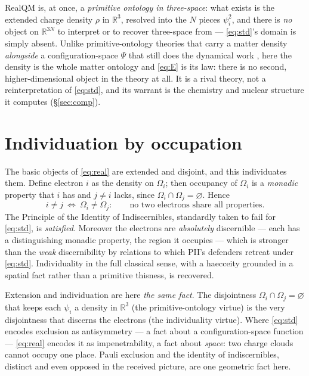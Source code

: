 \documentclass[11pt]{article}
\begin{document}
RealQM is, at once, a \emph{primitive ontology in three-space}: what exists is the extended charge density
$\rho$ in $\mathbb R^3$, resolved into the $N$ pieces $\psi_i^2$, and there is \emph{no} object on
$\mathbb R^{3N}$ to interpret or to recover three-space from --- \eqref{eq:std}'s domain is simply absent.
Unlike primitive-ontology theories that carry a matter density \emph{alongside} a configuration-space
$\Psi$ that still does the dynamical work \cite{Allori2013}, here the density is the whole matter ontology
and \eqref{eq:E} is its law: there is no second, higher-dimensional object in the theory at all. It is a
rival theory, not a reinterpretation of \eqref{eq:std}, and its warrant is the chemistry and nuclear
structure it computes (\S\ref{sec:comp}).

\section{Individuation by occupation}
\label{sec:ind}

The basic objects of \eqref{eq:real} are extended and disjoint, and this individuates them. Define electron
$i$ as the density on $\Omega_i$; then occupancy of $\Omega_i$ is a \emph{monadic} property that $i$ has
and $j\neq i$ lacks, since $\Omega_i\cap\Omega_j=\varnothing$. Hence
\begin{equation}
i\neq j\ \Longleftrightarrow\ \Omega_i\neq\Omega_j:\qquad
\text{no two electrons share all properties.}
\end{equation}
The Principle of the Identity of Indiscernibles, standardly taken to fail for \eqref{eq:std}, is
\emph{satisfied}. Moreover the electrons are \emph{absolutely} discernible --- each has a distinguishing
monadic property, the region it occupies --- which is stronger than the \emph{weak} discernibility by
relations \cite{MullerSaunders2008} to which PII's defenders retreat under \eqref{eq:std}. Individuality in
the full classical sense, with a haecceity grounded in a spatial fact rather than a primitive thisness, is
recovered.

Extension and individuation are here \emph{the same fact}. The disjointness $\Omega_i\cap\Omega_j=\varnothing$
that keeps each $\psi_i$ a density in $\mathbb R^3$ (the primitive-ontology virtue) is the very disjointness
that discerns the electrons (the individuality virtue). Where \eqref{eq:std} encodes exclusion as
antisymmetry --- a fact about a configuration-space function --- \eqref{eq:real} encodes it as
impenetrability, a fact about \emph{space}: two charge clouds cannot occupy one place. Pauli exclusion and
the identity of indiscernibles, distinct and even opposed in the received picture, are one geometric fact
here.
\end{document}
